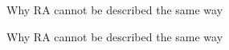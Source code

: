 \documentclass[xcolor={dvipsnames}, notes]{beamer}
\begin{document}
    \begin{frame}{Why RA cannot be described the same way}

        \begin{figure}
        \end{figure}

        \begin{figure}
        \end{figure}

    \end{frame}

    \begin{frame}{Why RA cannot be described the same way}
        
        \begin{figure}
        \end{figure}

    \end{frame}
\end{document}

